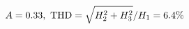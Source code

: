 \documentclass[preview]{standalone}
\begin{document}
\begin{align*}
\special{dvisvgm:raw <g id='unique000'>}A=0.33,\ \text{THD}=\sqrt{H_2^2+H_3^2}/H_1=6.4\%\special{dvisvgm:raw </g>}
\end{align*}
\end{document}
